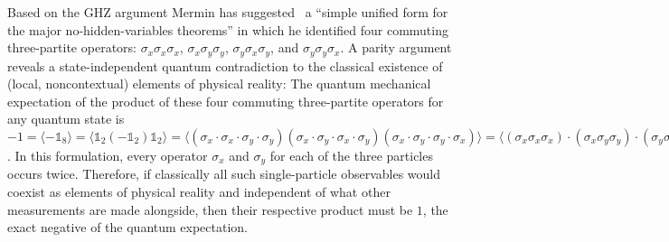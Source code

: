 \documentclass[
  twocolumn,
 showpacs,
 showkeys,
 preprintnumbers,
 amsmath,amssymb,
 aps,
 prl,
  longbibliography,
 floatfix,
 ]{revtex4-2}
\newcommand\myotimes{ }
\begin{document}
Based on the GHZ argument Mermin has suggested~\cite{mermin,mermin90b} a ``simple unified form for the major no-hidden-variables theorems'' in which he identified four commuting three-partite operators:
$\sigma_x \myotimes  \sigma_x \myotimes  \sigma_x$, $\sigma_x \myotimes  \sigma_y \myotimes  \sigma_y$, $\sigma_y \myotimes  \sigma_x \myotimes  \sigma_y$, and $\sigma_y \myotimes  \sigma_y \myotimes  \sigma_x$.
A parity argument reveals a state-independent quantum contradiction to the classical existence of (local, noncontextual) elements of physical reality:
The quantum mechanical expectation of the product of these four commuting three-partite operators for any quantum state is
$
-1= \langle
-\mathbb{1}_8
 \rangle
=
\langle
\mathbb{1}_2
\myotimes
(
-\mathbb{1}_2
)
\myotimes
\mathbb{1}_2
 \rangle
=
\langle
(
\sigma_x  \cdot \sigma_x  \cdot \sigma_y   \cdot \sigma_y
)
\myotimes
(
\sigma_x   \cdot \sigma_y   \cdot \sigma_x   \cdot  \sigma_y
)
\myotimes
(
\sigma_x   \cdot \sigma_y    \cdot \sigma_y    \cdot \sigma_x
) \rangle
=
\langle  (\sigma_x \myotimes  \sigma_x \myotimes  \sigma_x) \cdot (\sigma_x \myotimes  \sigma_y \myotimes  \sigma_y) \cdot (\sigma_y \myotimes  \sigma_x \myotimes  \sigma_y) \cdot (\sigma_y \myotimes  \sigma_y \myotimes  \sigma_x) \rangle
=
\langle  \sigma_x \myotimes  \sigma_x \myotimes  \sigma_x  \rangle \langle \sigma_x \myotimes  \sigma_y \myotimes  \sigma_y  \rangle \langle
\sigma_y \myotimes  \sigma_x \myotimes  \sigma_y  \rangle \langle   \sigma_y \myotimes  \sigma_y \myotimes  \sigma_x \rangle
$.
In this formulation, every operator $\sigma_x$ and $\sigma_y$ for each of the three particles occurs twice. Therefore, if classically all such single-particle observables would coexist as elements of physical reality and independent of what other measurements are made alongside,
then their respective product must be $1$, the exact negative of the quantum expectation.
\end{document}

